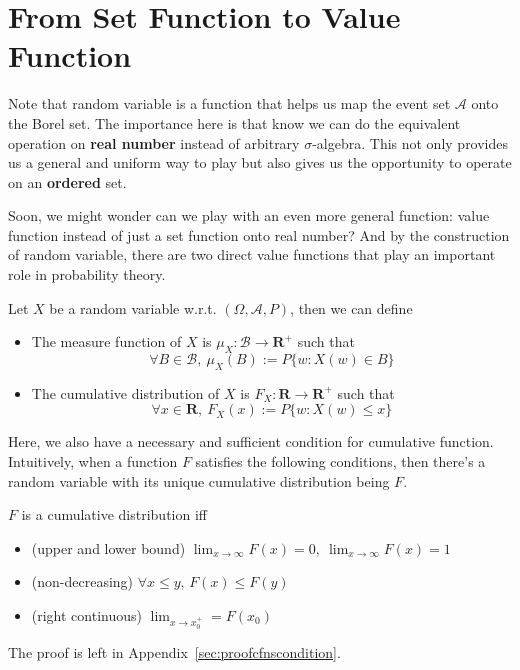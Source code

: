 \documentclass[Probability_Theory.tex]{subfiles}
\begin{document}
\section{From Set Function to Value Function}
Note that random variable is a function that helps us map the event set $\mathcal{A}$ onto the Borel set. The importance here is that know we can do the equivalent operation on {\bf real number} instead of arbitrary $\sigma$-algebra. This not only provides us a general and uniform way to play but also gives us the opportunity to operate on an {\bf ordered} set.

Soon, we might wonder can we play with an even more general function: value function instead of just a set function onto real number? And by the construction of random variable, there are two direct value functions that play an important role in probability theory.
\begin{theorem}
	Let $X$ be a random variable w.r.t. $(\Omega,\mathcal{A},P)$, then we can define
	\begin{itemize}
		\item The measure function of $X$ is $\mu_X:\mathcal{B}\rightarrow\mathbf{R}^+$ such that $$\forall B\in\mathcal{B},\ \mu_X(B):=P\{w:X(w)\in B\}$$
		\item The cumulative distribution of $X$ is $F_X:\mathbf{R}\rightarrow\mathbf{R}^+$ such that $$\forall x\in\mathbf{R},\ F_X(x):=P\{w:X(w)\leq x \}$$
	\end{itemize}
\end{theorem}

Here, we also have a necessary and sufficient condition for cumulative function. Intuitively, when a function $F$ satisfies the following conditions, then there's a random variable with its unique cumulative distribution being $F$.

\begin{theorem}\label{cdnscondition}
	$F$ is a cumulative distribution iff
	\begin{itemize}
		\item (upper and lower bound) $\lim_{x\rightarrow\infty}F(x)=0,\ \lim_{x\rightarrow\infty}F(x) = 1$
		\item (non-decreasing) $\forall x\leq y$, $F(x)\leq F(y)$
		\item (right continuous) $\lim_{x\rightarrow x_0^+} = F(x_0)$
	\end{itemize}
\end{theorem}
The proof is left in Appendix~\ref{sec:proofcfnscondition}.
\end{document}
